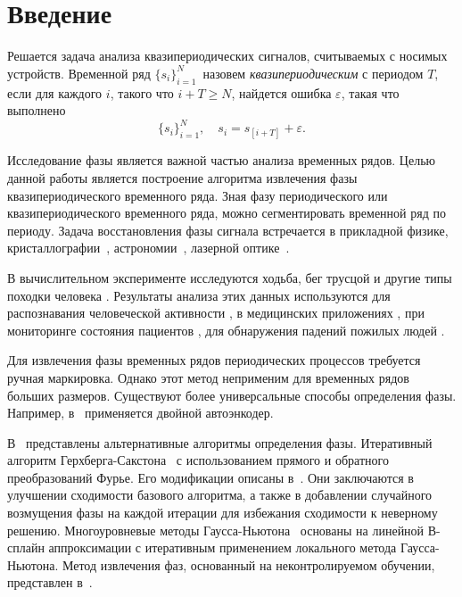 \documentclass[12pt, twoside]{article}
\theoremstyle{definition}
\begin{document}
\section{Введение}
Решается задача анализа квазипериодических сигналов, считываемых с носимых устройств.
Временной ряд $\{s_i\}_{i=1}^N$\, назовем \emph{квазипериодическим} с периодом $T$, если для каждого $i$, такого что $i + T \geq N$, найдется ошибка $\varepsilon$, такая что выполнено
\begin{equation}\label{st}
  \{s_i\}_{i=1}^N, \quad s_{i} = s_{[i + T]} + \varepsilon.
\end{equation}

Исследование фазы является важной частью анализа временных рядов. Целью данной работы является построение алгоритма извлечения фазы квазипериодического временного ряда. Зная фазу периодического или квазипериодического временного ряда, можно сегментировать временной ряд по периоду. Задача восстановления фазы сигнала встречается в прикладной физике, кристаллографии~\cite{kim1991phase, hauptman1991phase, millane1990phase}, астрономии~\cite{fienup1987phase, bruck1979ambiguity}, лазерной оптике~\cite{seifert2004nontrivial, seifert2006multilevel}. 

В вычислительном эксперименте исследуются ходьба, бег трусцой и другие типы походки человека \cite{jansi2018novel, khan2010triaxial, ignatov2016human}. Результаты анализа этих данных используются для распознавания человеческой активности \cite{bevilacqua2018human, jansi2018novel, lu2017towards, ordonez2016deep, sun2018sequential, wang2020wearable}, в медицинских приложениях \cite{bussmann1998ambulatory, najafi2003ambulatory}, при мониторинге состояния пациентов \cite{grunerbl2014smartphone}, для обнаружения падений пожилых людей \cite{ma2014depth}.

Для извлечения фазы временных рядов периодических процессов требуется ручная маркировка. Однако этот метод неприменим для временных рядов больших размеров. Существуют более универсальные способы определения фазы. Например, в~\cite{jatesiktat2017unsupervised} применяется двойной автоэнкодер.

В~\cite{yang1994gerchberg, guo2015iterative, seifert2006multilevel, jatesiktat2018unsupervised} представлены альтернативные алгоритмы определения фазы. Итеративный алгоритм Герхберга-Сакстона~\cite{yang1994gerchberg} с использованием прямого и обратного преобразований Фурье. Его модификации описаны в~\cite{guo2015iterative}. Они заключаются в улучшении сходимости базового алгоритма, а также в добавлении случайного возмущения фазы на каждой итерации для избежания сходимости к неверному решению. Многоуровневые методы Гаусса-Ньютона~\cite{seifert2006multilevel} основаны на линейной В-сплайн аппроксимации с итеративным применением локального метода Гаусса-Ньютона. Метод извлечения фаз, основанный на неконтролируемом обучении, представлен в~\cite{jatesiktat2018unsupervised}.
\end{document}
